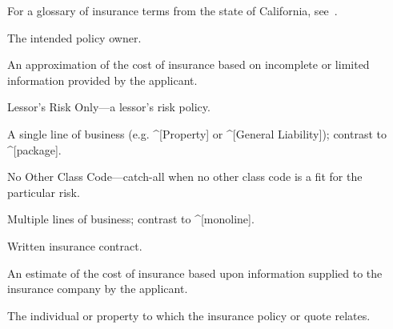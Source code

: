 %
%


For a glossary of insurance terms from the state of California,
see~\cite{gls-ins-calif}.

\begin{description}
  The intended policy owner.

  An approximation of the cost of insurance based on incomplete or limited
  information provided by the applicant.

  Lessor's Risk Only---a lessor's risk policy.

  A single line of business (e.g. ^[Property] or ^[General Liability]); contrast
  to ^[package].

  No Other Class Code---catch-all when no other class code is a fit for the
  particular risk.

  Multiple lines of business; contrast to ^[monoline].

  Written insurance contract.

  An estimate of the cost of insurance based upon information supplied to the
  insurance company by the applicant.

  The individual or property to which the insurance policy or quote relates.
\end{description}

\enddeptgroup
